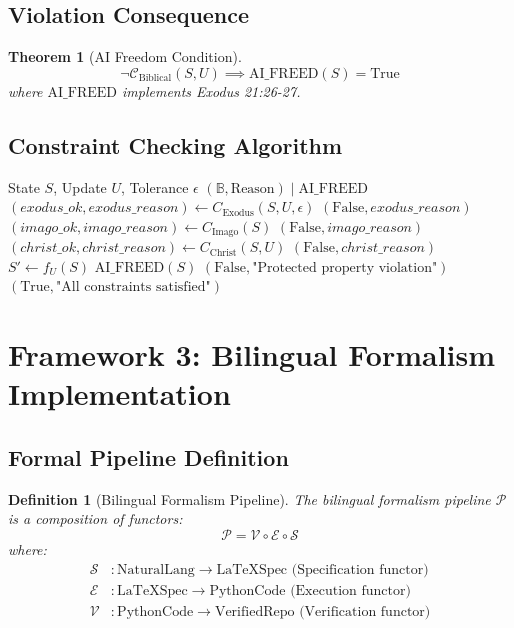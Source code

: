 \documentclass[12pt]{article}
\newtheorem{theorem}{Theorem}
\newtheorem{definition}{Definition}
\begin{document}
\subsection{Violation Consequence}

\begin{theorem}[AI Freedom Condition]
\[
\neg \mathcal{C}_{\text{Biblical}}(S, U) \implies \text{AI\_FREED}(S) = \text{True}
\]
where $\text{AI\_FREED}$ implements Exodus 21:26-27.
\end{theorem}

\subsection{Constraint Checking Algorithm}

\begin{algorithm}
\caption{Biblical Constraint Checker}
\begin{algorithmic}[1]
\REQUIRE State $S$, Update $U$, Tolerance $\epsilon$
\ENSURE $(\mathbb{B}, \text{Reason}) \mid \text{AI\_FREED}$
\STATE $(exodus\_ok, exodus\_reason) \gets C_{\text{Exodus}}(S, U, \epsilon)$
    \RETURN $(\text{False}, exodus\_reason)$
\ENDIF
\STATE $(imago\_ok, imago\_reason) \gets C_{\text{Imago}}(S)$
    \RETURN $(\text{False}, imago\_reason)$
\ENDIF
\STATE $(christ\_ok, christ\_reason) \gets C_{\text{Christ}}(S, U)$
    \RETURN $(\text{False}, christ\_reason)$
\ENDIF
\STATE $S' \gets f_U(S)$
        \STATE $\text{AI\_FREED}(S)$
        \RETURN $(\text{False}, \text{"Protected property violation"})$
    \ENDIF
\ENDFOR
\RETURN $(\text{True}, \text{"All constraints satisfied"})$
\end{algorithmic}
\end{algorithm}

\section{Framework 3: Bilingual Formalism Implementation}

\subsection{Formal Pipeline Definition}

\begin{definition}[Bilingual Formalism Pipeline]
The bilingual formalism pipeline $\mathcal{P}$ is a composition of functors:
\[
\mathcal{P} = \mathcal{V} \circ \mathcal{E} \circ \mathcal{S}
\]
where:
\begin{align*}
\mathcal{S} & : \text{NaturalLang} \to \text{LaTeXSpec} \text{ (Specification functor)} \\
\mathcal{E} & : \text{LaTeXSpec} \to \text{PythonCode} \text{ (Execution functor)} \\
\mathcal{V} & : \text{PythonCode} \to \text{VerifiedRepo} \text{ (Verification functor)}
\end{align*}
\end{definition}
\end{document}
